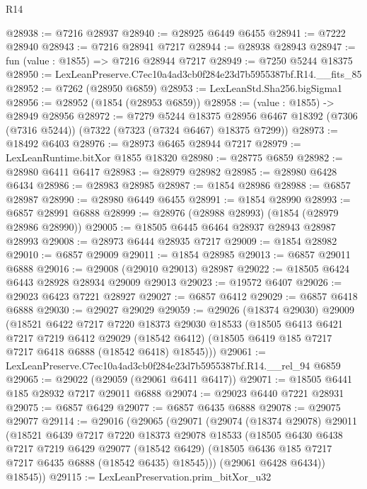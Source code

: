 \begin{lexlean}{R14}
\begin{coremodule}
@28938 := @7216 @28937
@28940 := @28925 @6449 @6455
@28941 := @7222 @28940
@28943 := @7216 @28941 @7217
@28944 := @28938 @28943
@28947 := fun (value : @1855) => @7216 @28944 @7217
@28949 := @7250 @5244 @18375
@28950 := LexLeanPreserve.C7ec10a4ad3cb0f284e23d7b5955387bf.R14.__fits_85
@28952 := @7262 (@28950 @6859)
@28953 := LexLeanStd.Sha256.bigSigma1
@28956 := @28952 (@1854 (@28953 @6859))
@28958 := (value : @1855) -> @28949 @28956
@28972 := @7279
    @5244
    @18375
    @28956
    @6467
    @18392
    (@7306 (@7316 @5244))
    (@7322 (@7323 (@7324 @6467) @18375 @7299))
@28973 := @18492 @6403
@28976 := @28973 @6465 @28944 @7217
@28979 := LexLeanRuntime.bitXor @1855 @18320
@28980 := @28775 @6859
@28982 := @28980 @6411 @6417
@28983 := @28979 @28982
@28985 := @28980 @6428 @6434
@28986 := @28983 @28985
@28987 := @1854 @28986
@28988 := @6857 @28987
@28990 := @28980 @6449 @6455
@28991 := @1854 @28990
@28993 := @6857 @28991 @6888
@28999 := @28976 (@28988 @28993) (@1854 (@28979 @28986 @28990))
@29005 := @18505 @6445 @6464 @28937 @28943 @28987 @28993
@29008 := @28973 @6444 @28935 @7217
@29009 := @1854 @28982
@29010 := @6857 @29009
@29011 := @1854 @28985
@29013 := @6857 @29011 @6888
@29016 := @29008 (@29010 @29013) @28987
@29022 := @18505 @6424 @6443 @28928 @28934 @29009 @29013
@29023 := @19572 @6407
@29026 := @29023 @6423 @7221 @28927
@29027 := @6857 @6412
@29029 := @6857 @6418 @6888
@29030 := @29027 @29029
@29059 := @29026
    (@18374 @29030)
    @29009
    (@18521
      @6422
      @7217
      @7220
      @18373
      @29030
      @18533
      (@18505
        @6413
        @6421
        @7217
        @7219
        @6412
        @29029
        (@18542 @6412)
        (@18505 @6419 @185 @7217 @7217 @6418 @6888 (@18542 @6418) @18545)))
@29061 := LexLeanPreserve.C7ec10a4ad3cb0f284e23d7b5955387bf.R14.__rel_94 @6859
@29065 := @29022 (@29059 (@29061 @6411 @6417))
@29071 := @18505 @6441 @185 @28932 @7217 @29011 @6888
@29074 := @29023 @6440 @7221 @28931
@29075 := @6857 @6429
@29077 := @6857 @6435 @6888
@29078 := @29075 @29077
@29114 := @29016
    (@29065
      (@29071
        (@29074
          (@18374 @29078)
          @29011
          (@18521
            @6439
            @7217
            @7220
            @18373
            @29078
            @18533
            (@18505
              @6430
              @6438
              @7217
              @7219
              @6429
              @29077
              (@18542 @6429)
              (@18505 @6436 @185 @7217 @7217 @6435 @6888 (@18542 @6435) @18545)))
          (@29061 @6428 @6434))
        @18545))
@29115 := LexLeanPreservation.prim_bitXor_u32

\end{coremodule}
\end{lexlean}
